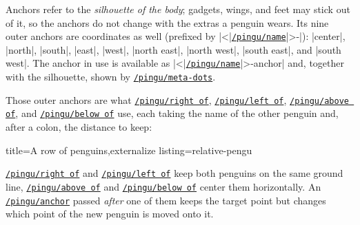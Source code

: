 \documentclass[parskip=half,english,numbers=noenddot,footnotes=nomultiple,oneside,fontsize=10pt,DIV=15,headinclude]{scrartcl}
\makeatletter
\def\pingu@listing@text{}
\def\lpingu#1{\begingroup\def\pingu@listing@text{#1}\lstinline[style=lstpingu,breakatwhitespace]'#1'\endgroup}
\newcommand*\keyref[2][/pingu/]{\hyperref[pk:#1#2]{\lpingu{#1#2}}}
\makeatother
\begin{document}
Anchors refer to the \textit{silhouette of the body}; gadgets, wings, and feet
may stick out of it, so the anchors do not change with the extras a penguin
wears. Its nine outer anchors are coordinates as well (prefixed by
|<|\keyref{name}|>-|): |center|, |north|, |south|, |east|, |west|,
|north east|, |north west|, |south east|, and |south west|. The anchor in use
is available as |<|\keyref{name}|>-anchor| and, together with the silhouette,
shown by \keyref{meta-dots}.

Those outer anchors are what \keyref{right of}, \keyref{left of},
\keyref{above of}, and \keyref{below of} use, each taking the name of the other
penguin and, after a colon, the distance to keep:
\begin{tcblisting}{title={A row of penguins},externalize listing=relative-pengu}
\begin{tikzpicture}
	\pingu[name=a,wings wave]
	\pingu[name=b,right of=a:5mm,large size]
	\pingu[name=c,left of=a:5mm,small size]
	\pingu[name=d,above of=a:2mm,eyes shiny]
	\pingu[name=e,below of=a:2mm,body=pingu@blue]
\end{tikzpicture}
\end{tcblisting}
\keyref{right of} and \keyref{left of} keep both penguins on the same ground
line, \keyref{above of} and \keyref{below of} center them horizontally. An
\keyref{anchor} passed \textit{after} one of them keeps the target point but
changes which point of the new penguin is moved onto it.
\end{document}
